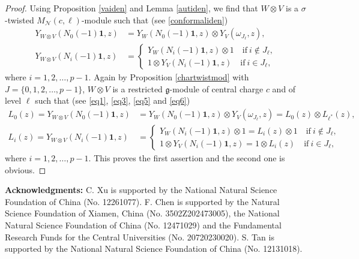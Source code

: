 \documentclass[12pt, reqno]{amsart}
\numberwithin{equation}{section}
\numberwithin{equation}{section}
\def\g{\mathfrak{g}}
\newcommand{\CN}{\mathcal{N}}
\begin{document}
\begin{proof}
 Using Proposition \ref{vaiden} and Lemma \ref{autiden}, we find that
 $W\otimes V$ is a $\sigma$-twisted $M_{\CN}(c,{\bm \ell})$-module such that (see \eqref{conformaliden})
 \begin{equation}\begin{split}\label{eq6}
  Y_{W\otimes V}(N_0(-1){\bm 1},z)&=Y_W(N_0(-1){\bm 1},z)\otimes Y_V(\omega_{J_{\bm\ell}},z),\\
  Y_{W\otimes V}(N_i(-1){\bm 1},z)&=\begin{cases}
  Y_W(N_i(-1){\bm 1},z)\otimes 1\quad \text{if}\ i\notin J_{\bm \ell},\\
  1\otimes Y_V(N_i(-1){\bm 1},z)\quad \text{if}\ i\in J_{\bm \ell},
  \end{cases}
  \end{split}
 \end{equation}
 where $i=1,2,\dots,p-1$.
 Again by Proposition \ref{chartwistmod} with $J=\{0,1,2,\dots,p-1\}$, $W\otimes V$ is a restricted $\g$-module of central charge $c$ and of level ${\bm \ell}$  such that (see \eqref{eq1}, \eqref{eq3}, \eqref{eq5} and \eqref{eq6})
 \begin{equation*}\begin{split}
  L_0(z)=Y_{W\otimes V}(N_0(-1){\bm 1},z)&=Y_W(N_0(-1){\bm 1},z)\otimes Y_V(\omega_{J_{\bm\ell}},z)=L_0(z)\otimes L_{{\bm\ell}^*}(z),\\
  L_i(z)=Y_{W\otimes V}(N_i(-1){\bm 1},z)&=\begin{cases}
  Y_W(N_i(-1){\bm 1},z)\otimes 1=L_i(z)\otimes 1\quad \text{if}\ i\notin J_{\bm \ell},\\
  1\otimes Y_V(N_i(-1){\bm 1},z)=1\otimes L_i(z)\quad \text{if}\ i\in J_{\bm \ell},
  \end{cases}
  \end{split}
 \end{equation*}
 where $i=1,2,\dots,p-1$. This proves the first assertion and the second one is obvious.
\end{proof}


\bigskip

\textbf{Acknowledgments:}
C. Xu is supported by the National Natural Science Foundation of China (No. 12261077).
F. Chen is supported by the Natural Science Foundation of Xiamen, China (No. 3502Z202473005), the National Natural Science Foundation of China (No. 12471029) and the Fundamental Research Funds for the Central Universities (No. 20720230020).
S. Tan is supported by the National Natural Science Foundation of China (No. 12131018).
\end{document}
